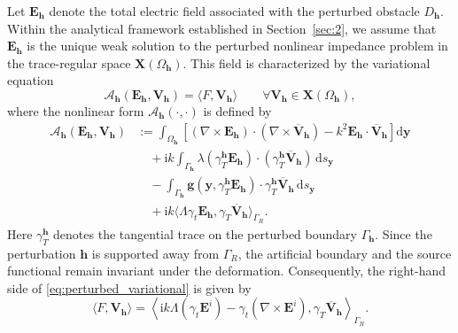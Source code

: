 \documentclass[10pt,a4paper]{amsart}
\numberwithin{equation}{section}
\begin{document}
Let $\mathbf{E}_{\mathbf{h}}$ denote the total electric field associated with the perturbed obstacle $D_{\mathbf{h}}$. Within the analytical framework established in Section~\ref{sec:2}, we assume that $\mathbf{E}_{\mathbf{h}}$ is the unique weak solution to the perturbed nonlinear impedance problem in the trace-regular space $\mathbf{X}(\Omega_{\mathbf{h}})$. This field is characterized by the variational equation
\begin{equation}\label{eq:perturbed_variational}
\mathcal{A}_{\mathbf{h}}(\mathbf{E}_{\mathbf{h}}, \mathbf{V}_{\mathbf{h}}) = \langle F, \mathbf{V}_{\mathbf{h}} \rangle \qquad \forall \mathbf{V}_{\mathbf{h}} \in \mathbf{X}(\Omega_{\mathbf{h}}),
\end{equation}
where the nonlinear form $\mathcal{A}_{\mathbf{h}}(\cdot, \cdot)$ is defined by
\begin{equation}\label{eq:perturbed_var_form}
\begin{aligned}
\mathcal{A}_{\mathbf{h}}(\mathbf{E}_{\mathbf{h}}, \mathbf{V}_{\mathbf{h}}) &:= \int_{\Omega_{\mathbf{h}}} \left[ (\nabla \times \mathbf{E}_{\mathbf{h}}) \cdot (\nabla \times \overline{\mathbf{V}}_{\mathbf{h}}) - k^2 \mathbf{E}_{\mathbf{h}} \cdot \overline{\mathbf{V}}_{\mathbf{h}} \right] \mathrm{d}\boldsymbol{y} \\
&\quad + \mathrm{i}k \int_{\Gamma_{\mathbf{h}}} \lambda (\gamma_T^{\mathbf{h}} \mathbf{E}_{\mathbf{h}}) \cdot (\gamma_T^{\mathbf{h}} \overline{\mathbf{V}}_{\mathbf{h}}) \,\mathrm{d}s_{\boldsymbol{y}} \\
&\quad - \int_{\Gamma_{\mathbf{h}}} \mathbf{g}(\boldsymbol{y}, \gamma_T^{\mathbf{h}} \mathbf{E}_{\mathbf{h}}) \cdot \gamma_T^{\mathbf{h}} \overline{\mathbf{V}}_{\mathbf{h}} \,\mathrm{d}s_{\boldsymbol{y}} \\
&\quad + \mathrm{i}k \langle \Lambda \gamma_t \mathbf{E}_{\mathbf{h}}, \gamma_T \overline{\mathbf{V}}_{\mathbf{h}} \rangle_{\Gamma_R}.
\end{aligned}
\end{equation}
Here $\gamma_T^{\mathbf{h}}$ denotes the tangential trace on the perturbed boundary $\Gamma_{\mathbf{h}}$.
Since the perturbation $\mathbf{h}$ is supported away from $\Gamma_R$, the artificial boundary and the source functional remain invariant under the deformation. Consequently, the right-hand side of \eqref{eq:perturbed_variational} is given by
\begin{equation}\label{eq:F_perturbed}
\langle F, \mathbf{V}_{\mathbf{h}} \rangle = \left\langle \mathrm{i}k \Lambda (\gamma_t \mathbf{E}^i) - \gamma_t (\nabla \times \mathbf{E}^i), \gamma_T \overline{\mathbf{V}}_{\mathbf{h}} \right\rangle_{\Gamma_R}.
\end{equation}
\end{document}
